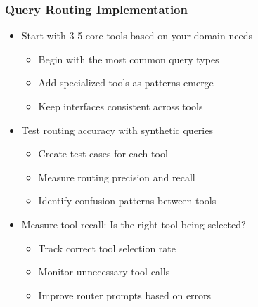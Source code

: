 {    \begin{frame}
        \frametitle{Query Routing Implementation}
        \begin{itemize}
            \item Start with 3-5 core tools based on your domain needs
            \begin{itemize}
                \item Begin with the most common query types
                \item Add specialized tools as patterns emerge
                \item Keep interfaces consistent across tools
            \end{itemize}
            \item Test routing accuracy with synthetic queries
            \begin{itemize}
                \item Create test cases for each tool
                \item Measure routing precision and recall
                \item Identify confusion patterns between tools
            \end{itemize}
            \item Measure tool recall: Is the right tool being selected?
            \begin{itemize}
                \item Track correct tool selection rate
                \item Monitor unnecessary tool calls
                \item Improve router prompts based on errors
            \end{itemize}
        \end{itemize}
    \end{frame}

}
